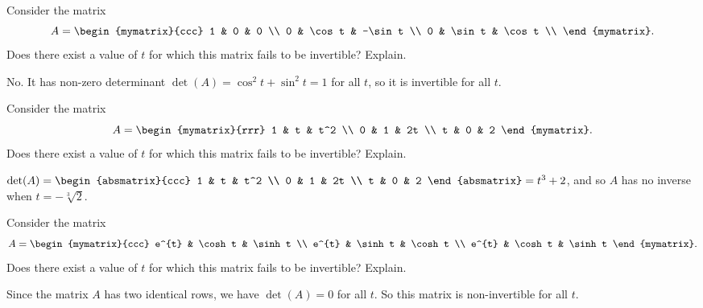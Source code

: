 \begin{ex}
  Consider the matrix
  \begin{equation*}
    A =
    \begin{mymatrix}{ccc}
      1 & 0 & 0 \\
      0 & \cos t & -\sin t \\
      0 & \sin t & \cos t \\
    \end{mymatrix}.
  \end{equation*}
  Does there exist a value of $t$ for which this matrix fails to be
  invertible? Explain.
  \begin{sol}
    No. It has non-zero determinant $\det(A)=\cos^2 t+\sin^2 t = 1$ for
    all $t$, so it is invertible for all $t$.
  \end{sol}
\end{ex}

\begin{ex}
  Consider the matrix
  \begin{equation*}
    A =
    \begin{mymatrix}{rrr}
      1 & t & t^2 \\
      0 & 1 & 2t \\
      t & 0 & 2
    \end{mymatrix}.
  \end{equation*}
  Does there exist a value of $t$ for which this matrix fails to be
  invertible? Explain.
  \begin{sol}
    $\det(A) = \begin{absmatrix}{ccc}
      1 & t & t^2 \\
      0 & 1 & 2t \\
      t & 0 & 2
    \end{absmatrix} = t^3+2$,
    and so $A$ has no inverse when $t=-\sqrt[3]{2}$.
  \end{sol}
\end{ex}

\begin{ex}
  Consider the matrix
  \begin{equation*}
    A =
    \begin{mymatrix}{ccc}
      e^{t} & \cosh t & \sinh t \\
      e^{t} & \sinh t & \cosh t \\
      e^{t} & \cosh t & \sinh t
    \end{mymatrix}.
  \end{equation*}
  Does there exist a value of $t$ for which this matrix fails to be
  invertible? Explain.
  \begin{sol}
    Since the matrix $A$ has two identical rows, we have $\det(A)=0$
    for all $t$. So this matrix is non-invertible for all $t$.
  \end{sol}
\end{ex}

